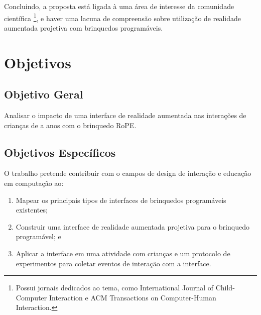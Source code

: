 Concluindo, a proposta está ligada à uma área de interesse da comunidade científica \footnote{Possui jornais dedicados ao tema, como International Journal of Child-Computer Interaction e ACM Transactions on Computer-Human Interaction.}, e haver uma lacuna de compreensão sobre utilização de realidade aumentada projetiva com brinquedos programáveis.

\section{Objetivos}
\label{s_cintro_objetivos}

\subsection{Objetivo Geral}
\label{ss_cintro_objetivo_geral}


Analisar o impacto de uma interface de realidade aumentada nas interações de crianças de \idadeinicial a \idadefinal anos com o brinquedo RoPE.

\subsection{Objetivos Específicos}
\label{ss_cintro_objetivos_espec}

O trabalho pretende contribuir com o campos de design de interação e educação em computação ao:

\begin{enumerate}
    
    \item\label{obj_mapear} Mapear os principais tipos de interfaces de brinquedos programáveis existentes;
    
    \item\label{obj_interface} Construir uma interface de realidade aumentada projetiva para o brinquedo programável; e
    
    \item\label{obj_avaliar} Aplicar a interface em uma atividade com crianças e  um protocolo de experimentos para coletar eventos de interação com a interface.
    
\end{enumerate}
